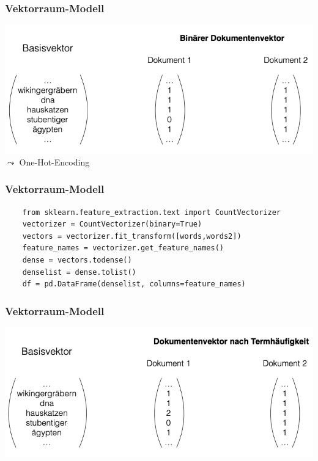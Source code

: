     
\begin{frame}
    \frametitle{Vektorraum-Modell}
    \vspace{1.5cm}
    \includegraphics[width=\linewidth]{fig8/binaervektor}
    $\leadsto$ One-Hot-Encoding
\end{frame}
    
    
\begin{frame}[fragile]
    \frametitle{Vektorraum-Modell}
    
    \begin{verbatim}
    from sklearn.feature_extraction.text import CountVectorizer
    vectorizer = CountVectorizer(binary=True)
    vectors = vectorizer.fit_transform([words,words2])
    feature_names = vectorizer.get_feature_names()
    dense = vectors.todense()
    denselist = dense.tolist()
    df = pd.DataFrame(denselist, columns=feature_names)
    \end{verbatim}
\end{frame}
      
    
\begin{frame}
    \frametitle{Vektorraum-Modell}
    \vspace{1.5cm}
    \includegraphics[width=\linewidth]{fig8/tfvektor}
    
\end{frame}



